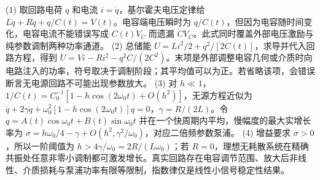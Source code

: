 (1) 取回路电荷 \(q\) 和电流 \(i=\dot q\)，基尔霍夫电压定律给 \(L\ddot q+R\dot q+q/C(t)=V(t)\)。电容端电压瞬时为 \(q/C(t)\)，但因为电容随时间变化，电容电流不能错误写成 \(C(t)\dot V_C\) 而遗漏 \(\dot C V_C\)。此式同时覆盖外部电压激励与纯参数调制两种功率通道。
(2) 总储能 \(U=Li^2/2+q^2/[2C(t)]\)，求导并代入回路方程，得到 \(\dot U=Vi-Ri^2-q^2\dot C/(2C^2)\)。末项是外部调整电容几何或介质时向电路注入的功率，符号取决于调制阶段；其平均值可以为正。若省略该项，会错误断言无电源回路不可能出现参数放大。
(3) 对 \(h\ll1\)，\(1/C(t)=C_0^{-1}[1-h\cos(2\omega_0t)+O(h^2)]\)，无源方程近似为 \(\ddot q+2\gamma\dot q+\omega_0^2[1-h\cos(2\omega_0t)]q=0\)，\(\gamma=R/(2L)\)。令 \(q=A(t)\cos\omega_0t+B(t)\sin\omega_0t\) 并在一个快周期内平均，慢幅度的最大实增长率为 \(\sigma=h\omega_0/4-\gamma+O(h^2,\gamma^2/\omega_0)\)，对应二倍频参数泵浦。
(4) 增益要求 \(\sigma>0\)，所以一阶阈值为 \(h>4\gamma/\omega_0=2R/(L\omega_0)\)；若 \(R=0\)，理想无耗散系统在精确共振处任意非零小调制都可激发增长。真实回路存在电容调节范围、放大后非线性、介质损耗与泵浦功率有限等限制，指数律仅是线性小信号稳定性结果。

